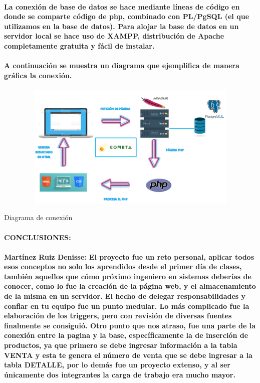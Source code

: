 \documentclass{article}
\begin{document}
    \paragraph{La conexión de base de datos se hace mediante líneas de código en donde se comparte código de php, combinado con PL/PgSQL (el que utilizamos en la base de datos). Para alojar la base de datos en un servidor local se hace uso de XAMPP, distribución de Apache completamente gratuita y fácil de instalar.\\\\
    A continuación se muestra un diagrama que ejemplifica de manera gráfica la conexión.}
    
      \begin{center}
	   \includegraphics[height= 6cm, width=14cm]{conexion.PNG}
	   \caption{Diagrama de conexión}
	     \label{Inter}
	 \end{center}
    
    \paragraph{CONCLUSIONES:}
    \paragraph{Martínez Ruiz Denisse: El proyecto fue un reto personal, aplicar todos esos conceptos no solo los aprendidos desde el primer día de clases, también aquellos que cómo próximo ingeniero en sistemas deberías de conocer, como lo fue la creación de la página web, y el almacenamiento de la misma en un servidor. El hecho de delegar responsabilidades y confiar en tu equipo fue un punto medular. Lo más complicado fue la elaboración de los triggers, pero con revisión de diversas fuentes finalmente se consiguió. Otro punto que nos atraso, fue una parte de la conexión entre la pagina y la base, específicamente la de inserción de productos, ya que primero se debe ingresar información a la tabla VENTA y esta te genera el número de venta que se debe ingresar a la tabla DETALLE, por lo demás fue un proyecto extenso, y al ser únicamente dos integrantes la carga de trabajo era mucho mayor. }
\end{document}
